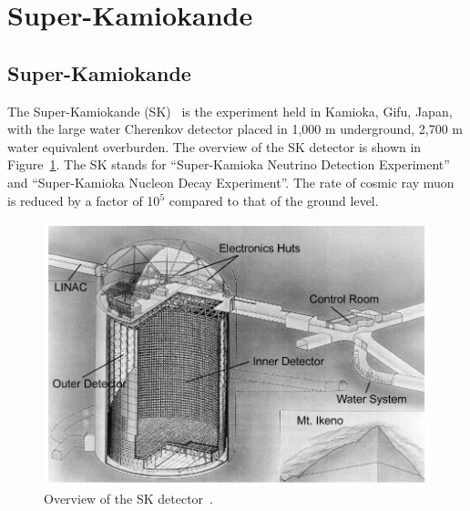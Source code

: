 
%
%

\section{Super-Kamiokande}\label{Section_002}

\subsection{Super-Kamiokande}
\vs\hs The Super-Kamiokande (SK)~\cite{2003Fukuda} is the experiment held in Kamioka, Gifu, Japan, with the large water Cherenkov detector placed in 1,000 m underground, 2,700 m water equivalent overburden.
The overview of the SK detector is shown in Figure~\ref{002_F01_SK}.
The SK stands for ``Super-Kamioka Neutrino Detection Experiment'' and ``Super-Kamioka Nucleon Decay Experiment''.
The rate of cosmic ray muon is reduced by a factor of 10$^{\text{5}}$ compared to that of the ground level.\\

\begin{figure}[h]
	\centering
	\includegraphics[width=15cm]{Figures/002/F01_SK}
	\caption[Overview of the Super-Kamiokande detector]{\label{002_F01_SK} Overview of the SK detector~\cite{2003Fukuda}.}
\end{figure}

